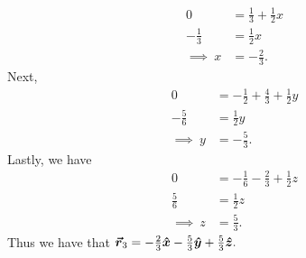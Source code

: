 \documentclass[12pt]{article} %
\begin{document}
\begin{solution}
\begin{align*}
    0&= \frac{1}{3} +\frac{1}{2}x\\
    -\frac{1}{3}&= \frac{1}{2}x\\
    \implies~ x&= -\frac{2}{3}.
\end{align*}
Next,
\begin{align*}
    0&= -\frac{1}{2} +\frac{4}{3}+\frac{1}{2}y\\
    -\frac{5}{6}&= \frac{1}{2}y\\
    \implies~ y&= -\frac{5}{3}.
\end{align*}
Lastly, we have
\begin{align*}
    0&= -\frac{1}{6}-\frac{2}{3} +\frac{1}{2}z\\
    \frac{5}{6} &= \frac{1}{2}z\\
    \implies~ z&= \frac{5}{3}.
\end{align*}
Thus we have that $\boldsymbol{\vec{r}}_3 = -\frac{2}{3} \boldsymbol{\hat{x}} - \frac{5}{3}\boldsymbol{\hat{y}} + \frac{5}{3}\boldsymbol{\hat{z}}.$
\end{solution}
\end{document}
